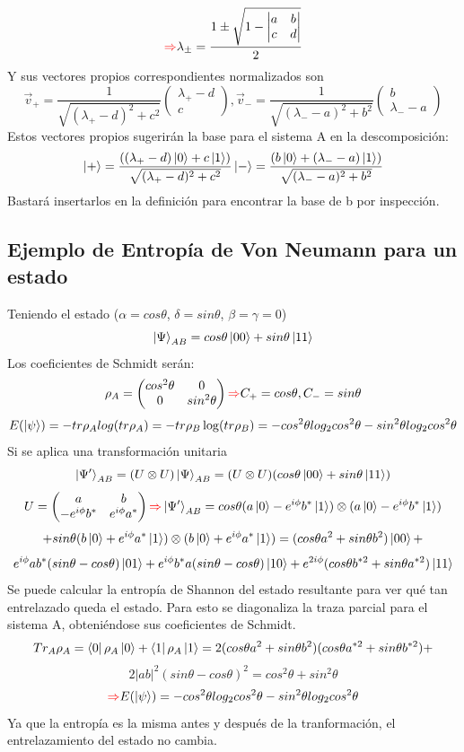 \documentclass{book}
\begin{document}
$$\textcolor{red}{\Rightarrow}\lambda_\pm=\frac{1\pm\sqrt{1-\left|\begin{matrix}a &b\\c&d\end{matrix}\right|}}{2}$$ Y sus vectores propios correspondientes normalizados son
$$\vec{v}_+=\frac{1}{\sqrt{(\lambda_+-d)^2+c^2}}\begin{pmatrix} \lambda_+-d\\c\end{pmatrix}, \vec{v}_-=\frac{1}{\sqrt{(\lambda_--a)^2+b^2}}\begin{pmatrix} b\\ \lambda_--a\end{pmatrix}$$
Estos vectores propios sugerirán la base para el sistema A en la descomposición:
$$ \ket{+}=\frac{((\lambda_+-d)\ket{0}+c\ket{1})}{\sqrt{(\lambda_+-d)^2+c^2}}
\ket{-}=\frac{(b\ket{0}+(\lambda_--a)\ket{1})}{\sqrt{(\lambda_--a)^2+b^2}}$$
Bastará insertarlos en la definición para encontrar la base de b por inspección. 
\subsection{Ejemplo de Entropía de Von Neumann para un estado} Teniendo el estado ($\alpha=cos\theta$, $\delta=sin\theta$, $\beta=\gamma=0$) $$ \ket{\Psi}_{AB}=cos\theta\ket{00}+sin\theta\ket{11} $$ 
Los coeficientes de Schmidt serán:
$$ \rho_A=\begin{pmatrix} cos^2\theta & 0\\ 0 & sin^2\theta \end{pmatrix}\textcolor{red}{\Rightarrow} C_+=cos\theta, C_-=sin\theta$$
$$ E(\ket{\psi})=-tr\rho_A log(tr\rho_A)=-tr\rho_B \log(tr\rho_B)=-cos^2\theta log_2cos^2\theta-sin^2\theta log_2cos^2\theta$$
Si se aplica una transformación unitaria
$$ \ket{\Psi^\prime}_{AB}=(U\otimes U)\ket{\Psi}_{AB}=(U\otimes U)(cos\theta\ket{00}+sin\theta\ket{11})$$
$$ U=\begin{pmatrix} a&b\\ -e^{i\phi}b^*&e^{i\phi}a^*\end{pmatrix}\textcolor{red}{\Rightarrow} \ket{\Psi^\prime}_{AB}=cos\theta (a\ket{0}-e^{i\phi}b^*\ket{1})\otimes(a\ket{0}-e^{i\phi}b^*\ket{1})$$ $$+sin\theta(b\ket{0}+e^{i\phi}a^*\ket{1})\otimes(b\ket{0}+e^{i\phi}a^*\ket{1})=(cos\theta a^2+sin\theta b^2)\ket{00}+$$ $$e^{i\phi}ab^*(sin\theta-cos\theta)\ket{01}+e^{i\phi}b^*a(sin\theta-cos\theta)\ket{10}+e^{2i\phi}(cos\theta b^{*2}+sin\theta a^{*2})\ket{11}$$
Se puede calcular la entropía de Shannon del estado resultante para ver qué tan entrelazado queda el estado. Para esto se diagonaliza la traza parcial para el sistema A, obteniéndose sus coeficientes de Schmidt. $$ Tr_A\rho_A=\bra{0}\rho_A\ket{0}+\bra{1}\rho_A\ket{1}=2(cos\theta a^2+sin\theta b^2)(cos\theta a^{*2}+sin\theta b^{*2})+$$ $$2\lvert ab\rvert^2(sin\theta-cos\theta)^2=cos^2\theta +sin^2\theta$$
$$ \textcolor{red}{\Rightarrow} E(\ket{\psi})=-cos^2\theta log_2cos^2\theta-sin^2\theta log_2cos^2\theta$$
Ya que la entropía es la misma antes y después de la tranformación, el entrelazamiento del estado no cambia.
\end{document}

